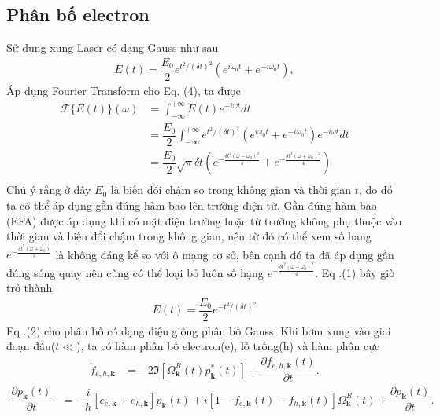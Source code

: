 \documentclass{article}
\newcommand{\f}[2]{\dfrac{#1}{#2}}
\begin{document}
\subsection{Phân bố electron}
Sử dụng xung Laser có dạng Gauss như sau
\begin{gather}
	E(t) = \f{E_{0}}{2} e^{t^{2} / (\delta t)^{2}} (e^{i\omega_{0} t} + e^{-i\omega_{0} t}),
\end{gather}
Áp dụng Fourier Transform cho Eq. (4), ta được
\begin{equation}
	\begin{aligned}
		\mathcal{F}\{ E(t) \}(\omega)
		 & = \int_{-\infty}^{+\infty} E(t) e^{-i \omega t} dt                                                                                                     \\
		 & = \f{E_{0}}{2} \int_{-\infty}^{+\infty}  e^{t^{2} / (\delta t)^{2}} (e^{i\omega_{0} t} + e^{-i\omega_{0} t} ) e^{-i \omega t} dt                       \\
		 & = \f{E_{0}}{2} \sqrt{\pi} \delta t ( e^{- \frac{\delta t^{2} (\omega - \omega_{0})^{2} }{4}} + e^{- \frac{\delta {t}^{2} (\omega + \omega_{0})^{2}}{4}} )\\
	\end{aligned}
\end{equation}
Chú ý rằng ở đây $E_{0}$ là biến đổi chậm so trong không gian và thời gian $t$, do đó ta có thể áp dụng gần đúng hàm bao lên trường điện từ. Gần đúng hàm bao (EFA) được áp dụng khi có mặt điện trường hoặc từ trường không phụ thuộc vào thời gian và biến đổi chậm trong không gian, nên từ đó có thể xem số hạng $e^{- \frac{\delta {t}^{2} (\omega + \omega_{0})}{4}}$ là không đáng kể so với ô mạng cơ sở, bên cạnh đó ta đã áp dụng gần đúng sóng quay nên cũng có thể loại bỏ luôn số hạng $e^{- \frac{\delta t^{2} (\omega - \omega_{0})^{2} }{4}}$. Eq .(1) bây giờ trở thành
\begin{gather}
	E(t) = \f{E_{0}}{2} e^{-t^{2} / (\delta t)^{2}}
\end{gather}
Eq .(2) cho phân bố có dạng điệu giống phân bố Gauss. Khi bơm xung vào giai đoạn đầu($t\ll$), ta có hàm phân bố electron(e), lỗ trống(h) và hàm phân cực
\begin{equation}
	\begin{aligned}
		\dot{f}_{e,h,\mathbf{k}} 
		&= -2 \Im\left[ \Omega_{\mathbf{k}}^{R}(t) p_{\mathbf{k}}^{*}(t) \right] + \f{\partial f_{e,h,\mathbf{k}}(t)}{\partial t}.
	\end{aligned}
\end{equation}
\begin{equation}
	\begin{aligned}
		\f{\partial p_{\mathbf{k}}(t)}{\partial t}
		&= -\f{i}{\hbar} \left[ e_{e,\mathbf{k}} + e_{h,\mathbf{k}}\right] p_{\mathbf{k}}(t) + i \left[ 1 - f_{e,\mathbf{k}}(t) - f_{h,\mathbf{k}}(t)  \right] \Omega_{\mathbf{k}}^{R}(t) + \f{\partial p_{\mathbf{k}}(t)}{\partial t}.
	\end{aligned}
\end{equation}
\end{document}
